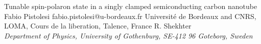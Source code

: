 \begin{conf-abstract}[]
{Tunable spin-polaron state in a singly clamped semiconducting carbon nanotube}
{\color{blue} Fabio Pistolesi}
{fabio.pistolesi@u-bordeaux.fr}
{Université de Bordeaux and CNRS, LOMA, Cours de la liberation, Talence, France}
{{\color{blue}R. Shekhter}\\ \textit{Department of Physics, University of Gothenburg, SE-412 96 Goteborg, Sweden}\\ 
\decofourleft \decofourright}





\printbibliography[heading=none]

\end{conf-abstract}
